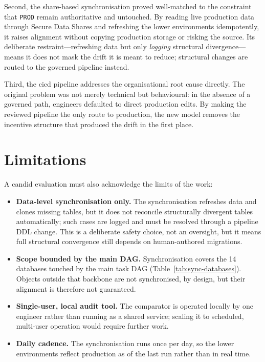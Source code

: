 Second, the share-based synchronisation proved well-matched to the constraint that \texttt{PROD} remain authoritative and untouched. By reading live production data through Secure Data Shares and refreshing the lower environments idempotently, it raises alignment without copying production storage or risking the source. Its deliberate restraint---refreshing data but only \emph{logging} structural divergence---means it does not mask the drift it is meant to reduce; structural changes are routed to the governed pipeline instead.

Third, the \gls{cicd} pipeline addresses the organisational root cause directly. The original problem was not merely technical but behavioural: in the absence of a governed path, engineers defaulted to direct production edits. By making the reviewed pipeline the only route to production, the new model removes the incentive structure that produced the drift in the first place.

\section{Limitations}
\label{sec:results-limitations}

A candid evaluation must also acknowledge the limits of the work:

\begin{itemize}
  \item \textbf{Data-level synchronisation only.} The synchronisation refreshes data and clones missing tables, but it does not reconcile structurally divergent tables automatically; such cases are logged and must be resolved through a pipeline DDL change. This is a deliberate safety choice, not an oversight, but it means full structural convergence still depends on human-authored migrations.
  \item \textbf{Scope bounded by the main DAG.} Synchronisation covers the 14 databases touched by the main task DAG (Table~\ref{tab:sync-databases}). Objects outside that backbone are not synchronised, by design, but their alignment is therefore not guaranteed.
  \item \textbf{Single-user, local audit tool.} The comparator is operated locally by one engineer rather than running as a shared service; scaling it to scheduled, multi-user operation would require further work.
  \item \textbf{Daily cadence.} The synchronisation runs once per day, so the lower environments reflect production as of the last run rather than in real time.
\end{itemize}

